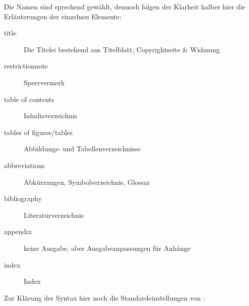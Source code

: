 Die Namen sind sprechend gewählt, dennoch folgen der Klarheit halber hier die
Erläuterungen der einzelnen Elemente:

\begin{description}
	\item[title] Die Titelei bestehend aus Titelblatt, Copyrightseite \& Widmung
	\item[restrictionnote] Sperrvermerk
	\item[table of contents] Inhaltsverzeichnis
	\item[tables of figures/tables] Abbildungs- und Tabellenverzeichnisse
	\item[abbreviations] Abkürzungen, Symbolverzeichnis, Glossar
	\item[bibliography] Literaturverzeichnis
	\item[appendix] keine Ausgabe, aber Ausgabeanpassungen für Anhänge
	\item[index] Index
\end{description}

Zur Klärung der Syntax hier noch die Standardeinstellungen von \HSKLbook:
\begin{verbatim*}



\end{verbatim*}
